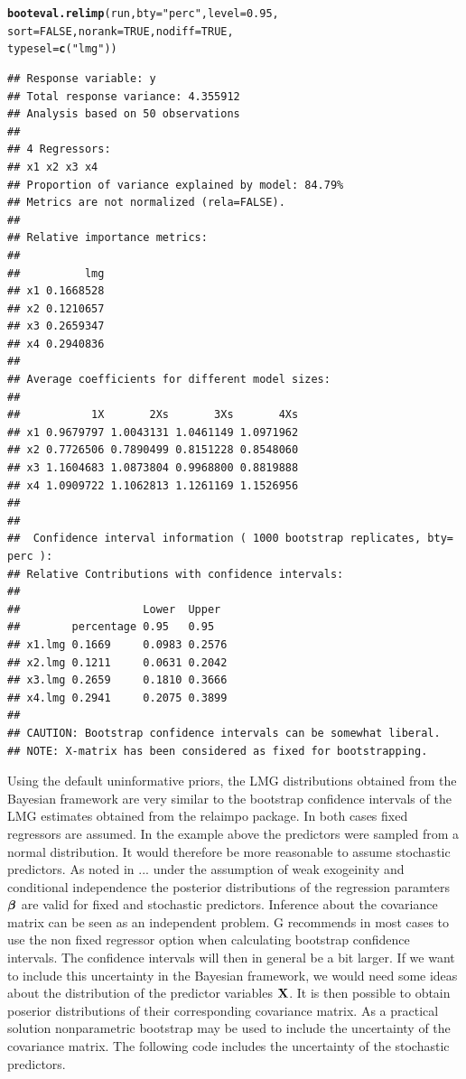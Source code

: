 \documentclass[11pt,a4paper,twoside]{book}\usepackage[]{graphicx}\usepackage[]{color}
\makeatletter
\newcommand{\hlnum}[1]{\textcolor[rgb]{0.686,0.059,0.569}{#1}}%
\newcommand{\hlstr}[1]{\textcolor[rgb]{0.192,0.494,0.8}{#1}}%
\newcommand{\hlstd}[1]{\textcolor[rgb]{0.345,0.345,0.345}{#1}}%
\newcommand{\hlkwc}[1]{\textcolor[rgb]{0.333,0.667,0.333}{#1}}%
\newcommand{\hlkwd}[1]{\textcolor[rgb]{0.737,0.353,0.396}{\textbf{#1}}}%
\newenvironment{kframe}{%
 \def\at@end@of@kframe{}%
 \ifinner\ifhmode%
  \def\at@end@of@kframe{\end{minipage}}%
  \begin{minipage}{\columnwidth}%
 \fi\fi%
 \def\FrameCommand##1{\hskip\@totalleftmargin \hskip-\fboxsep
 \colorbox{shadecolor}{##1}\hskip-\fboxsep
     \hskip-\linewidth \hskip-\@totalleftmargin \hskip\columnwidth}%
 \MakeFramed {\advance\hsize-\width
   \@totalleftmargin\z@ \linewidth\hsize
   \@setminipage}}%
 {\par\unskip\endMakeFramed%
 \at@end@of@kframe}
\newenvironment{knitrout}{}{} %
\makeatother
\begin{document}
\begin{knitrout}
\begin{kframe}
\begin{alltt}
\hlkwd{booteval.relimp}\hlstd{(run,} \hlkwc{bty} \hlstd{=} \hlstr{"perc"}\hlstd{,} \hlkwc{level} \hlstd{=} \hlnum{0.95}\hlstd{,}
                \hlkwc{sort} \hlstd{=} \hlnum{FALSE}\hlstd{,} \hlkwc{norank} \hlstd{=} \hlnum{TRUE}\hlstd{,} \hlkwc{nodiff} \hlstd{=} \hlnum{TRUE}\hlstd{,}
                \hlkwc{typesel} \hlstd{=} \hlkwd{c}\hlstd{(}\hlstr{"lmg"}\hlstd{))}
\end{alltt}
\begin{verbatim}
## Response variable: y 
## Total response variance: 4.355912 
## Analysis based on 50 observations 
## 
## 4 Regressors: 
## x1 x2 x3 x4 
## Proportion of variance explained by model: 84.79%
## Metrics are not normalized (rela=FALSE). 
## 
## Relative importance metrics: 
## 
##          lmg
## x1 0.1668528
## x2 0.1210657
## x3 0.2659347
## x4 0.2940836
## 
## Average coefficients for different model sizes: 
## 
##           1X       2Xs       3Xs       4Xs
## x1 0.9679797 1.0043131 1.0461149 1.0971962
## x2 0.7726506 0.7890499 0.8151228 0.8548060
## x3 1.1604683 1.0873804 0.9968800 0.8819888
## x4 1.0909722 1.1062813 1.1261169 1.1526956
## 
##  
##  Confidence interval information ( 1000 bootstrap replicates, bty= perc ): 
## Relative Contributions with confidence intervals: 
##  
##                   Lower  Upper
##        percentage 0.95   0.95  
## x1.lmg 0.1669     0.0983 0.2576
## x2.lmg 0.1211     0.0631 0.2042
## x3.lmg 0.2659     0.1810 0.3666
## x4.lmg 0.2941     0.2075 0.3899
## 
## CAUTION: Bootstrap confidence intervals can be somewhat liberal. 
## NOTE: X-matrix has been considered as fixed for bootstrapping.
\end{verbatim}
\end{kframe}
\end{knitrout}


Using the default uninformative priors, the LMG distributions obtained from the Bayesian framework are very similar to the bootstrap confidence intervals of the LMG estimates obtained from the relaimpo package. In both cases fixed regressors are assumed. In the example above the predictors were sampled from a normal distribution. It would therefore be more reasonable to assume stochastic predictors. As noted in ... under the assumption of weak exogeinity and conditional independence the posterior distributions of the regression paramters ${\boldsymbol{\beta}}$ are valid for fixed and stochastic predictors. Inference about the covariance matrix can be seen as an independent problem. G recommends in most cases to use the non fixed regressor option when calculating bootstrap confidence intervals. The confidence intervals will then in general be a bit larger. If we want to include this uncertainty in the Bayesian framework, we would need some ideas about the distribution of the predictor variables ${\mathbf{X}}$. It is then possible to obtain poserior distributions of their corresponding covariance matrix. As a practical solution nonparametric bootstrap may be used to include the uncertainty of the covariance matrix. The following code includes the uncertainty of the stochastic predictors. 
\end{document}
